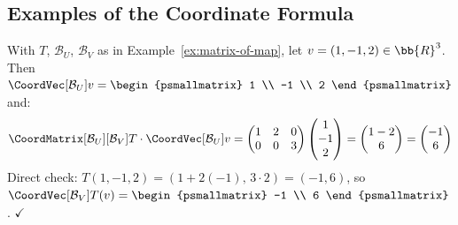 \subsection{Examples of the Coordinate Formula}

\begin{example}[{$\CoordVec[\mathcal{B}_V]{T(v)} = \CoordMatrix[\mathcal{B}_U][\mathcal{B}_V]{T} \cdot \CoordVec[\mathcal{B}_U]{v}$} --- I]
    With $T$, $\mathcal{B}_U$, $\mathcal{B}_V$ as in Example~\ref{ex:matrix-of-map}, let
    $v = (1, -1, 2) \in \bb{R}^3$. Then $\CoordVec[\mathcal{B}_U]{v}
    = \begin{psmallmatrix} 1 \\ -1 \\ 2 \end{psmallmatrix}$ and:
    \[
        \CoordMatrix[\mathcal{B}_U][\mathcal{B}_V]{T} \cdot \CoordVec[\mathcal{B}_U]{v}
        = \begin{pmatrix} 1 & 2 & 0 \\ 0 & 0 & 3 \end{pmatrix}
          \begin{pmatrix} 1 \\ -1 \\ 2 \end{pmatrix}
        = \begin{pmatrix} 1 - 2 \\ 6 \end{pmatrix}
        = \begin{pmatrix} -1 \\ 6 \end{pmatrix}
    \]
    Direct check: $T(1, -1, 2) = (1 + 2(-1),\, 3 \cdot 2) = (-1, 6)$, so
    $\CoordVec[\mathcal{B}_V]{T(v)}
    = \begin{psmallmatrix} -1 \\ 6 \end{psmallmatrix}$. $\checkmark$
\end{example}

